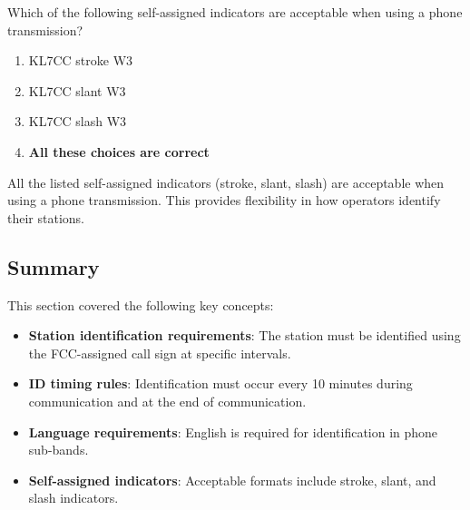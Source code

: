 
\begin{tcolorbox}[colback=gray!10!white,colframe=black!75!black,title={T1F06}]
    Which of the following self-assigned indicators are acceptable when using a phone transmission?
    \begin{enumerate}[label=\Alph*),noitemsep]
        \item KL7CC stroke W3
        \item KL7CC slant W3
        \item KL7CC slash W3
        \item \textbf{All these choices are correct}
    \end{enumerate}
\end{tcolorbox}
All the listed self-assigned indicators (stroke, slant, slash) are acceptable when using a phone transmission. This provides flexibility in how operators identify their stations.


\subsection*{Summary}
This section covered the following key concepts:
\begin{itemize}
    \item \textbf{Station identification requirements}: The station must be identified using the FCC-assigned call sign at specific intervals.
    \item \textbf{ID timing rules}: Identification must occur every 10 minutes during communication and at the end of communication.
    \item \textbf{Language requirements}: English is required for identification in phone sub-bands.
    \item \textbf{Self-assigned indicators}: Acceptable formats include stroke, slant, and slash indicators.
\end{itemize}
